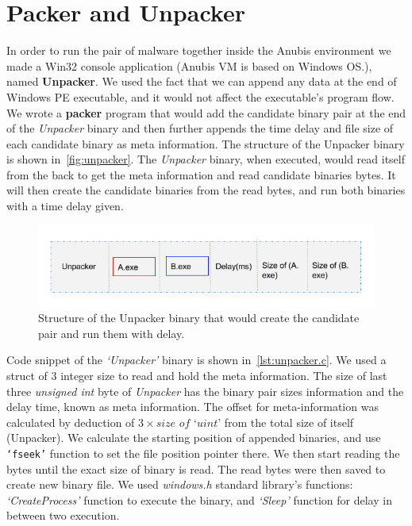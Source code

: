 \section{Packer and Unpacker}
\label{sec:packerunpacker}
In order to run the pair of malware together inside the Anubis environment we made a Win32 console application (Anubis VM is based on Windows OS.\@), named \textbf{Unpacker}.
We used the fact that we can append any data at the end of Windows PE executable, and it would not affect the executable's program flow.
We wrote a \textbf{packer} program that would add the candidate binary pair at the end of the \emph{Unpacker} binary and then further appends the time delay and file size of each candidate binary as meta information.
The structure of the Unpacker binary is shown in~\autoref{fig:unpacker}.
The \emph{Unpacker} binary, when executed, would read itself from the back to get the meta information and read candidate binaries bytes.
It will then create the candidate binaries from the read bytes, and run both binaries with a time delay given.\\
\begin{figure}[htbp]
  \centering
  \includegraphics[scale=0.5]{figures/unpacker.png}
\caption{Structure of the Unpacker binary that would create the candidate pair and run them with delay.}
\label{fig:unpacker}
\end{figure}

Code snippet of the \emph{`Unpacker'} binary is shown in~\autoref{lst:unpacker.c}.
We used a struct of 3 integer size to read and hold the meta information. The size of last three \textit{unsigned int} byte of \emph{Unpacker} has the binary pair sizes information and the delay time, known as meta information.
The offset for meta-information was calculated by deduction of $3 \times \textit{size of `uint'}$ from the total size of itself (Unpacker).
We calculate the starting position of appended binaries, and use \texttt{`fseek\(\)'} function to set the file position pointer there.
We then start reading the bytes until the exact size of binary is read.
The read bytes were then saved to create new binary file.
We used \emph{windows.h} standard library's functions: \emph{`CreateProcess'} function to execute the binary, and \emph{`Sleep'} function for delay in between two execution.\\

